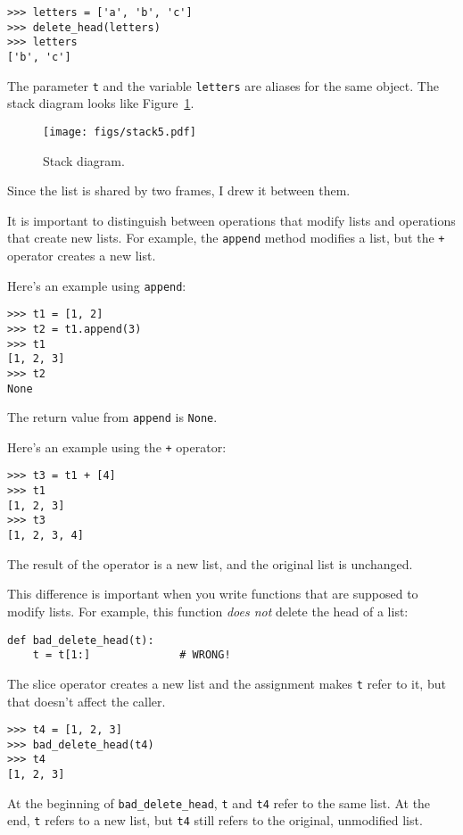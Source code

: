 \documentclass[10pt]{book}
\begin{document}
\begin{verbatim}
>>> letters = ['a', 'b', 'c']
>>> delete_head(letters)
>>> letters
['b', 'c']
\end{verbatim}
%
The parameter {\tt t} and the variable {\tt letters} are
aliases for the same object.  The stack diagram looks like
Figure~\ref{fig.stack5}.

\begin{figure}
\centerline
{\texttt{[image: figs/stack5.pdf]}}
\caption{Stack diagram.}
\label{fig.stack5}
\end{figure}

Since the list is shared by two frames, I drew
it between them.

It is important to distinguish between operations that
modify lists and operations that create new lists.  For
example, the {\tt append} method modifies a list, but the
{\tt +} operator creates a new list.

Here's an example using {\tt append}:
%
\begin{verbatim}
>>> t1 = [1, 2]
>>> t2 = t1.append(3)
>>> t1
[1, 2, 3]
>>> t2
None
\end{verbatim}
%
The return value from {\tt append} is {\tt None}.

Here's an example using the {\tt +} operator:
%
\begin{verbatim}
>>> t3 = t1 + [4]
>>> t1
[1, 2, 3]
>>> t3
[1, 2, 3, 4]
\end{verbatim}
%
The result of the operator is a new list, and the original list is
unchanged.

This difference is important when you write functions that
are supposed to modify lists.  For example, this function
{\em does not} delete the head of a list:
%
\begin{verbatim}
def bad_delete_head(t):
    t = t[1:]              # WRONG!
\end{verbatim}
%
The slice operator creates a new list and the assignment
makes {\tt t} refer to it, but that doesn't affect the caller.
%
\begin{verbatim}
>>> t4 = [1, 2, 3]
>>> bad_delete_head(t4)
>>> t4
[1, 2, 3]
\end{verbatim}
%
At the beginning of \verb"bad_delete_head", {\tt t} and {\tt t4}
refer to the same list.  At the end, {\tt t} refers to a new list,
but {\tt t4} still refers to the original, unmodified list.
\end{document}
